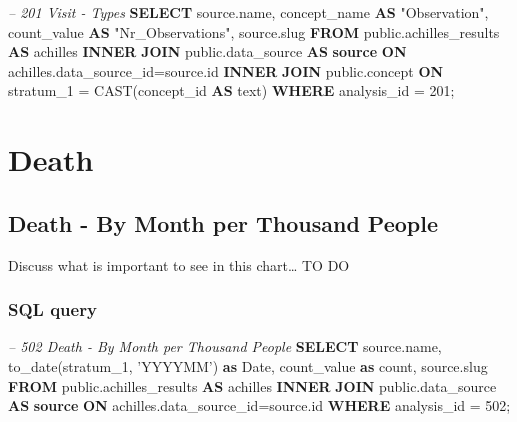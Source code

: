 \documentclass[]{book}
\newenvironment{Shaded}{\begin{snugshade}}{\end{snugshade}}
\newcommand{\KeywordTok}[1]{\textcolor[rgb]{0.13,0.29,0.53}{\textbf{#1}}}
\newcommand{\DataTypeTok}[1]{\textcolor[rgb]{0.13,0.29,0.53}{#1}}
\newcommand{\DecValTok}[1]{\textcolor[rgb]{0.00,0.00,0.81}{#1}}
\newcommand{\StringTok}[1]{\textcolor[rgb]{0.31,0.60,0.02}{#1}}
\newcommand{\CommentTok}[1]{\textcolor[rgb]{0.56,0.35,0.01}{\textit{#1}}}
\newcommand{\OtherTok}[1]{\textcolor[rgb]{0.56,0.35,0.01}{#1}}
\newcommand{\FunctionTok}[1]{\textcolor[rgb]{0.00,0.00,0.00}{#1}}
\newcommand{\NormalTok}[1]{#1}
\begin{document}
\begin{Shaded}
\begin{Highlighting}[]
\CommentTok{-- 201  Visit - Types}
\KeywordTok{SELECT}\NormalTok{ source.name, }
\NormalTok{       concept_name }\KeywordTok{AS} \OtherTok{"Observation"}\NormalTok{, }
\NormalTok{       count_value }\KeywordTok{AS} \OtherTok{"Nr_Observations"}\NormalTok{,}
\NormalTok{       source.slug}
\KeywordTok{FROM}\NormalTok{ public.achilles_results }\KeywordTok{AS}\NormalTok{ achilles }\KeywordTok{INNER} \KeywordTok{JOIN} 
\NormalTok{    public.data_source }\KeywordTok{AS} \KeywordTok{source} \KeywordTok{ON}\NormalTok{ achilles.data_source_id=source.id}
\KeywordTok{INNER} \KeywordTok{JOIN}\NormalTok{ public.concept }\KeywordTok{ON}\NormalTok{ stratum_1 = }\FunctionTok{CAST}\NormalTok{(concept_id }\KeywordTok{AS}\NormalTok{ text)}
\KeywordTok{WHERE}\NormalTok{ analysis_id = }\DecValTok{201}\NormalTok{;}
\end{Highlighting}
\end{Shaded}

\chapter{Death}\label{death}

\section{Death - By Month per Thousand
People}\label{death---by-month-per-thousand-people}

Discuss what is important to see in this chart\ldots{} TO DO

\subsection{SQL query}\label{sql-query-14}

\begin{Shaded}
\begin{Highlighting}[]
\CommentTok{-- 502  Death - By Month per Thousand People}
\KeywordTok{SELECT}\NormalTok{ source.name,}
    \FunctionTok{to_date}\NormalTok{(stratum_1, }\StringTok{'YYYYMM'}\NormalTok{) }\KeywordTok{as} \DataTypeTok{Date}\NormalTok{,}
\NormalTok{    count_value }\KeywordTok{as} \FunctionTok{count}\NormalTok{, }
\NormalTok{    source.slug}
\KeywordTok{FROM}\NormalTok{ public.achilles_results }\KeywordTok{AS}\NormalTok{ achilles }\KeywordTok{INNER} \KeywordTok{JOIN} 
\NormalTok{    public.data_source }\KeywordTok{AS} \KeywordTok{source} \KeywordTok{ON}\NormalTok{ achilles.data_source_id=source.id}
\KeywordTok{WHERE}\NormalTok{ analysis_id = }\DecValTok{502}\NormalTok{;}
\end{Highlighting}
\end{Shaded}
\end{document}

